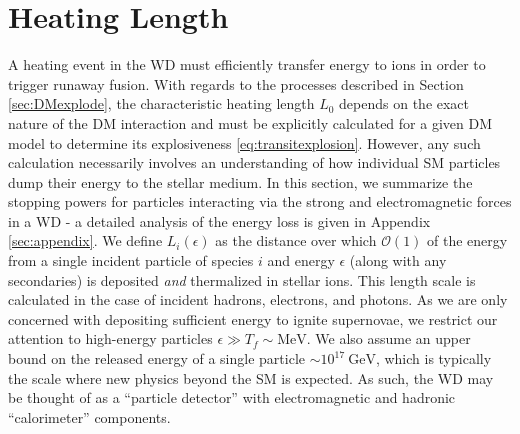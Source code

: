 \documentclass[twocolumn,showpacs,preprintnumbers,amsmath,amssymb,prd]{revtex4}
\newcommand{\OO}{\mathcal{O}}
\newcommand{\GeV}{\text{GeV}}
\begin{document}
\section{Heating Length}
\label{sec:HeatingLength}
A heating event in the WD must efficiently transfer energy to ions in order to trigger runaway fusion.
With regards to the processes described in Section \ref{sec:DMexplode}, the characteristic heating length $L_0$ depends on the exact nature of the DM interaction and must be explicitly calculated for a given DM model to determine its explosiveness \eqref{eq:transitexplosion}.
However, any such calculation necessarily involves an understanding of how individual SM particles dump their energy to the stellar medium.
In this section, we summarize the stopping powers for particles interacting via the strong and electromagnetic forces in a WD - a detailed analysis of the energy loss is given in Appendix \ref{sec:appendix}.
We define $L_i(\epsilon)$ as the distance over which $\OO(1)$ of the energy from a single incident particle of species $i$ and energy $\epsilon$ (along with any secondaries) is deposited \emph{and} thermalized in stellar ions.
This length scale is calculated in the case of incident hadrons, electrons, and photons.
As we are only concerned with depositing sufficient energy to ignite supernovae, we restrict our attention to high-energy particles $\epsilon \gg T_f \sim \text{MeV}$.
We also assume an upper bound on the released energy of a single particle $\sim 10^{17} ~\GeV$, which is typically the scale where new physics beyond the SM is expected.
As such, the WD may be thought of as a ``particle detector'' with electromagnetic and hadronic ``calorimeter'' components. 
\end{document}

